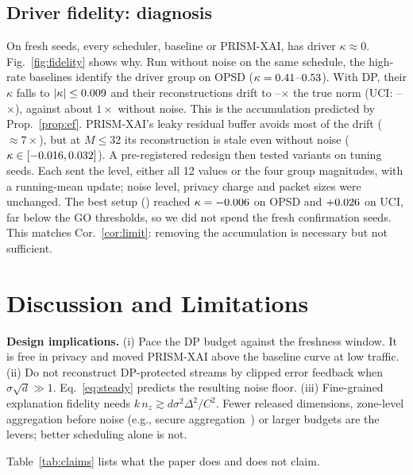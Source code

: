 \documentclass[conference]{IEEEtran}
\newcommand{\method}{PRISM-XAI}
\begin{document}
\subsection{Driver fidelity: diagnosis}
On fresh seeds, every scheduler, baseline or \method{}, has driver
$\kappa\approx0$. Fig.~\ref{fig:fidelity} shows why. Run without noise on the
same schedule, the high-rate baselines identify the driver group on OPSD
($\kappa=0.41$--$0.53$). With DP, their $\kappa$ falls to
$|\kappa|\le0.009$ and their reconstructions drift to
\diagBlRatioMin--\diagBlRatioMax$\times$ the true norm (UCI:
\diagUciRatioMin--\diagUciRatioMax$\times$), against about $1\times$ without noise.
This is the accumulation predicted by Prop.~\ref{prop:ef}. \method{}'s leaky
residual buffer avoids most of the drift ($\approx7\times$), but at $M\le32$ its
reconstruction is stale even without noise ($\kappa\in[-0.016,
0.032]$). A pre-registered redesign then tested
\redNconfigs{} variants on tuning seeds. Each sent the level, either all 12
values or the four group magnitudes, with a running-mean update; noise level,
privacy charge and packet sizes were unchanged. The best setup
(\texttt{\redMech}) reached $\kappa=-0.006$ on OPSD and $+0.026$ on
UCI, far below the GO thresholds, so we did not spend the fresh confirmation
seeds. This matches Cor.~\ref{cor:limit}: removing the accumulation is necessary
but not sufficient.

\section{Discussion and Limitations}\label{sec:discussion}
\textbf{Design implications.} (i) Pace the DP budget against the freshness
window. It is free in privacy and moved \method{} above the baseline curve at
low traffic. (ii) Do not reconstruct DP-protected streams by clipped error
feedback when $\sigma\sqrt d\gg1$. Eq.~\eqref{eq:steady} predicts the resulting
noise floor. (iii) Fine-grained explanation fidelity needs
$k\,n_z\gtrsim d\sigma^2\Delta^2/C^2$. Fewer released dimensions,
zone-level aggregation before noise (e.g., secure
aggregation~\cite{bonawitz2017secagg}) or larger budgets are the levers; better
scheduling alone is not.

Table~\ref{tab:claims} lists what the paper does and does not claim.
\end{document}
